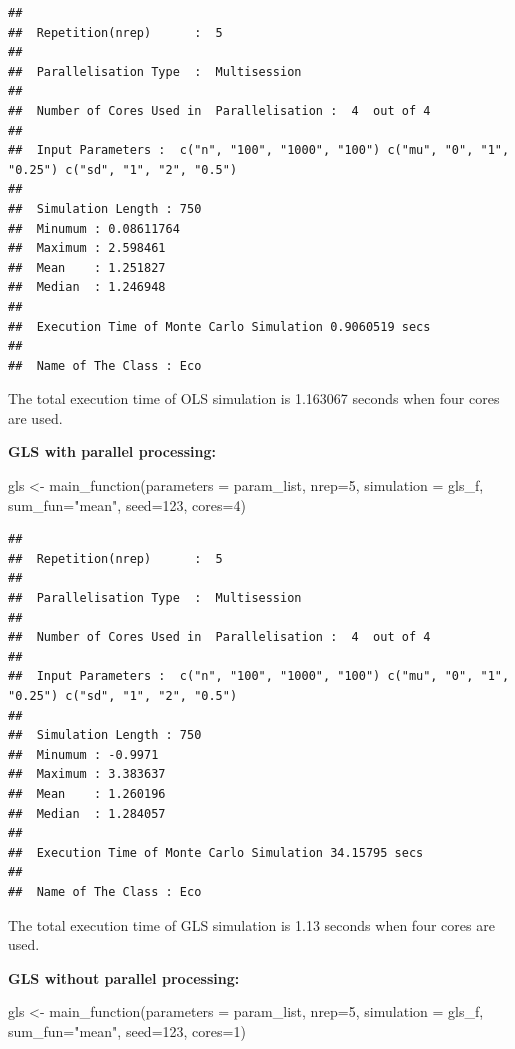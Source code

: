 \documentclass[11pt,a4paper]{article}
\newenvironment{Shaded}{\begin{snugshade}}{\end{snugshade}}
\newcommand{\AttributeTok}[1]{\textcolor[rgb]{0.77,0.63,0.00}{#1}}
\newcommand{\DecValTok}[1]{\textcolor[rgb]{0.00,0.00,0.81}{#1}}
\newcommand{\FunctionTok}[1]{\textcolor[rgb]{0.00,0.00,0.00}{#1}}
\newcommand{\NormalTok}[1]{#1}
\newcommand{\OtherTok}[1]{\textcolor[rgb]{0.56,0.35,0.01}{#1}}
\newcommand{\StringTok}[1]{\textcolor[rgb]{0.31,0.60,0.02}{#1}}
\begin{document}
\begin{verbatim}
## 
##  Repetition(nrep)      :  5 
## 
##  Parallelisation Type  :  Multisession 
## 
##  Number of Cores Used in  Parallelisation :  4  out of 4 
## 
##  Input Parameters :  c("n", "100", "1000", "100") c("mu", "0", "1", "0.25") c("sd", "1", "2", "0.5") 
## 
##  Simulation Length : 750 
##  Minumum : 0.08611764 
##  Maximum : 2.598461 
##  Mean    : 1.251827 
##  Median  : 1.246948 
## 
##  Execution Time of Monte Carlo Simulation 0.9060519 secs 
## 
##  Name of The Class : Eco
\end{verbatim}

The total execution time of OLS simulation is 1.163067 seconds when four
cores are used.

\textbf{GLS with parallel processing:}

\begin{Shaded}
\begin{Highlighting}[]
\NormalTok{gls }\OtherTok{\textless{}{-}} \FunctionTok{main\_function}\NormalTok{(}\AttributeTok{parameters =}\NormalTok{ param\_list,}
                     \AttributeTok{nrep=}\DecValTok{5}\NormalTok{,}
                     \AttributeTok{simulation =}\NormalTok{ gls\_f,}
                     \AttributeTok{sum\_fun=}\StringTok{"mean"}\NormalTok{,}
                     \AttributeTok{seed=}\DecValTok{123}\NormalTok{,}
                     \AttributeTok{cores=}\DecValTok{4}\NormalTok{)}
\end{Highlighting}
\end{Shaded}

\begin{verbatim}
## 
##  Repetition(nrep)      :  5 
## 
##  Parallelisation Type  :  Multisession 
## 
##  Number of Cores Used in  Parallelisation :  4  out of 4 
## 
##  Input Parameters :  c("n", "100", "1000", "100") c("mu", "0", "1", "0.25") c("sd", "1", "2", "0.5") 
## 
##  Simulation Length : 750 
##  Minumum : -0.9971 
##  Maximum : 3.383637 
##  Mean    : 1.260196 
##  Median  : 1.284057 
## 
##  Execution Time of Monte Carlo Simulation 34.15795 secs 
## 
##  Name of The Class : Eco
\end{verbatim}

The total execution time of GLS simulation is 1.13 seconds when four
cores are used.

\textbf{GLS without parallel processing:}

\begin{Shaded}
\begin{Highlighting}[]
\NormalTok{gls }\OtherTok{\textless{}{-}} \FunctionTok{main\_function}\NormalTok{(}\AttributeTok{parameters =}\NormalTok{ param\_list,}
                     \AttributeTok{nrep=}\DecValTok{5}\NormalTok{,}
                     \AttributeTok{simulation =}\NormalTok{ gls\_f,}
                     \AttributeTok{sum\_fun=}\StringTok{"mean"}\NormalTok{,}
                     \AttributeTok{seed=}\DecValTok{123}\NormalTok{,}
                     \AttributeTok{cores=}\DecValTok{1}\NormalTok{)}
\end{Highlighting}
\end{Shaded}
\end{document}
